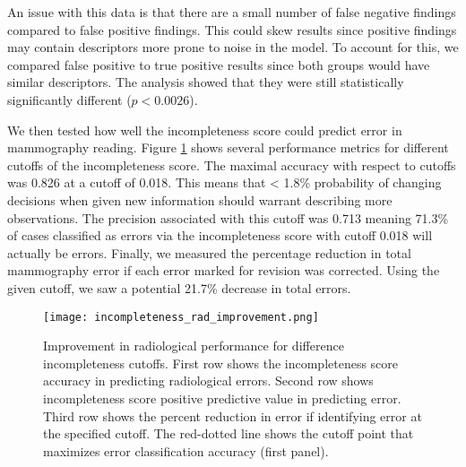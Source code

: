 An issue with this data is that there are a small number of false negative findings compared to false positive findings. This could skew results since positive findings may contain descriptors more prone to noise in the model. To account for this, we compared false positive to true positive results since both groups would have similar descriptors. The analysis showed that they were still statistically significantly different ($p<0.0026$).

\clearpage

We then tested how well the incompleteness score could predict error in mammography reading. Figure \ref{fig:incompleteness_rad_improvement} shows several performance metrics for different cutoffs of the incompleteness score. The maximal accuracy with respect to cutoffs was 0.826 at a cutoff of 0.018. This means that < 1.8\% probability of changing decisions when given new information should warrant describing more observations. The precision associated with this cutoff was 0.713 meaning 71.3\% of cases classified as errors via the incompleteness score with cutoff 0.018 will actually be errors. Finally, we measured the percentage reduction in total mammography error if each error marked for revision was corrected. Using the given cutoff, we saw a potential 21.7\% decrease in total errors.

\begin{figure}
\centering
\texttt{[image: incompleteness\_rad\_improvement.png]}
\caption[Radiological improvement with incompleteness scores]{Improvement in radiological performance for difference incompleteness cutoffs. First row shows the incompleteness score accuracy in predicting radiological errors. Second row shows incompleteness score positive predictive value in predicting error. Third row shows the percent reduction in error if identifying error at the specified cutoff. The red-dotted line shows the cutoff point that maximizes error classification accuracy (first panel).}
\label{fig:incompleteness_rad_improvement}
\end{figure}
